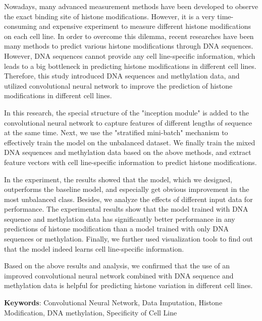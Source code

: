 Nowadays, many advanced measurement methods have been developed to observe the exact binding site of histone modifications. However, it is a very time-consuming and expensive experiment to measure different histone modifications on each cell line. In order to overcome this dilemma, recent researches have been many methods to predict various histone modifications through DNA sequences. However, DNA sequences cannot provide any cell line-specific information, which leads to a big bottleneck in predicting histone modifications in different cell lines. Therefore, this study introduced DNA sequences and methylation data, and utilized convolutional neural network to improve the prediction of histone modifications in different cell lines.

In this research, the special structure of the "inception module" is added to the convolutional neural network to capture features of different lengths of sequence at the same time. Next, we use the "stratified mini-batch" mechanism to effectively train the model on the unbalanced dataset. We finally train the mixed DNA sequences and methylation data based on the above methods, and extract feature vectors with cell line-specific information to predict histone modifications.

In the experiment, the results showed that the model, which we designed, outperforms the baseline model, and especially get obvious improvement in the most unbalanced class. Besides, we analyze the effects of different input data for performance. The experimental results show that the model trained with DNA sequence and methylation data has significantly better performance in any predictions of histone modification than a model trained with only DNA sequences or methylation. Finally, we further used visualization tools to find out that the model indeed learns cell line-specific information.

Based on the above results and analysis, we confirmed that the use of an improved convolutional neural network combined with DNA sequence and methylation data is helpful for predicting histone variation in different cell lines.

\begin{flushleft}
{{\bf Keywords}: Convolutional Neural Network, Data Imputation, Histone Modification, DNA methylation, Specificity of Cell Line}
\end{flushleft}
